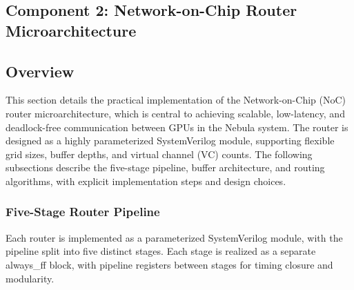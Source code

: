 \documentclass[11pt,a4paper]{article}
\begin{document}
\subsection{Component 2: Network-on-Chip Router Microarchitecture}

\subsection*{Overview}
This section details the practical implementation of the Network-on-Chip (NoC) router microarchitecture, which is central to achieving scalable, low-latency, and deadlock-free communication between GPUs in the Nebula system. The router is designed as a highly parameterized SystemVerilog module, supporting flexible grid sizes, buffer depths, and virtual channel (VC) counts. The following subsections describe the five-stage pipeline, buffer architecture, and routing algorithms, with explicit implementation steps and design choices.

\subsubsection{Five-Stage Router Pipeline}

Each router is implemented as a parameterized SystemVerilog module, with the pipeline split into five distinct stages. Each stage is realized as a separate always\_ff block, with pipeline registers between stages for timing closure and modularity.
\end{document}

